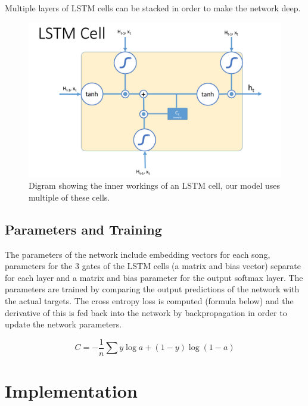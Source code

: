 \documentclass{article} %
\begin{document}
Multiple layers of LSTM cells can be stacked in order to make the network deep. 
\begin{figure}
\label{LSTM_cell}
	\begin{center}
		\includegraphics[scale = 0.4]{"../images/LSTM_cell"}
		\caption{Digram showing the inner workings of an LSTM cell, our model uses multiple of these cells.}
	\end{center}
\end{figure}

\subsection{Parameters and Training}
The parameters of the network include embedding vectors for each song, parameters for the 3 gates of the LSTM cells (a matrix and bias vector) separate for each layer and a matrix and bias parameter for the output softmax layer. The parameters are trained by comparing the output predictions of the network with the actual targets. The cross entropy loss is computed (formula below) and the derivative of this is fed back into the network by backpropagation in order to update the network parameters. \cite{NN_deeplearning}

\begin{equation}
C = -\frac{1}{n} \sum y \log a + (1 - y) \log(1-a)
\end{equation}

\section{Implementation}
\end{document}
